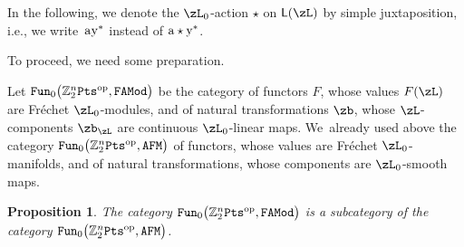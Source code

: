 \documentclass[10pt,a4paper]{amsart}
\newcommand{\op}[1]{\operatorname{#1}}
\newcommand{\Z}{{\mathbb Z}}
\newcommand{\0}{\otimes}
\newcommand{\z}{\Z_2^n}
\numberwithin{equation}{section}
\newtheorem{Proposition}[Theorem]{Proposition}
 { \theoremstyle{definition}
\newtheorem{Definition}[Theorem]{Definition}
\newtheorem{Example}[Theorem]{Example}
\newtheorem{Remark}[Theorem]{Remark} }
\begin{document}
In the following, we denote the $\zL_0$-action $\star$ on ${\sf L}(\zL)$ by simple juxtaposition, i.e., we write~${\rm a}{\rm y^*}$ instead of ${\rm a}\star{\rm y}^*$.

To proceed, we need some preparation.

Let ${\tt Fun}_0\big(\z{\tt Pts}^{\op{op}},{\tt FAMod}\big)$ be the category of functors $F$, whose values $F(\zL)$ are Fr\'echet $\zL_0$-modules, and of natural transformations $\zb$, whose $\zL$-components $\zb_\zL$ are continuous $\zL_0$-linear maps. We~already used above the category ${\tt Fun}_0\big(\z{\tt Pts}^{\op{op}},{\tt AFM}\big)$ of functors, whose values are Fr\'echet $\zL_0$-manifolds, and of natural transformations, whose components are $\zL_0$-smooth maps.

{\sloppy\begin{Proposition}%
The category ${\tt Fun}_0\big(\z{\tt Pts}^{\op{op}},{\tt FAMod}\big)$ is a subcategory of the category ${\tt Fun}_0\big(\z{\tt Pts}^{\op{op}},{\tt AFM}\big)$.
\end{Proposition}

}
\end{document}
